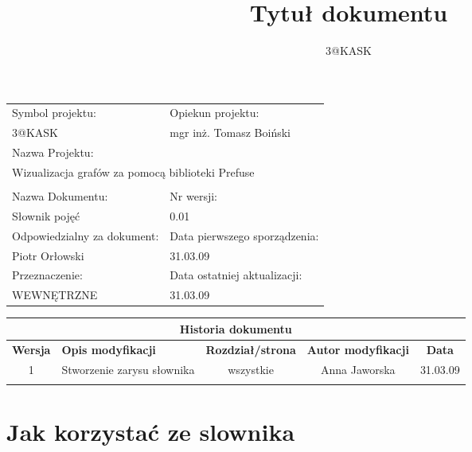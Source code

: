 \documentclass[a4paper,10pt]{article}
\title{Tytuł dokumentu}
\author{3@KASK}
\begin{document}



\maketitle


\begin{center}
\begin{tabular}{|p{7cm}|p{7cm}|}
\hline
Symbol projektu: & Opiekun projektu:   \tabularnewline 
3@KASK & mgr inż. Tomasz Boiński    \tabularnewline \hline
\multicolumn{2}{|l|}{Nazwa Projektu: } \tabularnewline
\multicolumn{2}{|l|}{Wizualizacja grafów za pomocą biblioteki Prefuse } \tabularnewline 
\hline
\multicolumn{2}{l}{ } \tabularnewline %
\hline 
Nazwa Dokumentu: & Nr wersji:   \tabularnewline 
Słownik pojęć & 0.01 \tabularnewline \hline
Odpowiedzialny za dokument: & Data pierwszego sporządzenia:   \tabularnewline 
Piotr Orłowski & 31.03.09 \tabularnewline \hline
Przeznaczenie: & Data ostatniej aktualizacji:   \tabularnewline 
WEWNĘTRZNE & 31.03.09 \tabularnewline \hline
\end{tabular}
\end{center}

\begin{center}
\begin{tabular}{|c|p{4cm}|c|c|c|}
\multicolumn{5}{c}{\textbf{Historia dokumentu}} \tabularnewline \hline
\textbf{Wersja} & \textbf{Opis modyfikacji} & \textbf{Rozdział/strona} & \textbf{Autor modyfikacji} & \textbf{Data} \tabularnewline \hline 
1 & Stworzenie zarysu słownika & wszystkie & Anna Jaworska & 31.03.09 \tabularnewline \hline
& & & &\tabularnewline \hline
\end{tabular}
\end{center}

\newpage
\tableofcontents
\newpage

\section{Jak korzystać ze slownika}
\end{document}
